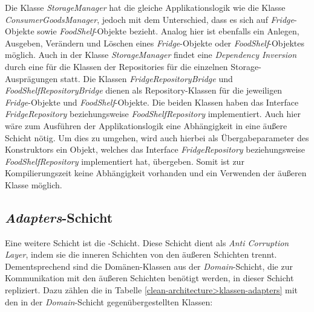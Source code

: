 Die Klasse \textit{StorageManager} hat die gleiche Applikationslogik wie die Klasse \textit{ConsumerGoodsManager}, jedoch mit dem Unterschied, dass es sich auf \textit{Fridge}-Objekte sowie \textit{FoodShelf}-Objekte bezieht.
Analog hier ist ebenfalls ein Anlegen, Ausgeben, Verändern und Löschen eines \textit{Fridge}-Objekte oder \textit{FoodShelf}-Objektes möglich.
Auch in der Klasse \textit{StorageManager} findet eine \textit{Dependency Inversion} durch eine \href{https://github.com/lucasmerkel/dhbw-advancedswe-programmentwurf/blob/2bab7b1c200507e4550ce7025485261d0e95ce07/swe_programmentwurf/consumergoods-inventory-planner/2-cip-application/src/main/java/de/dhbw/cip/application/StorageManager.java#L21}{} für die Klassen der Repositories für die einzelnen Storage-Ausprägungen statt.
Die Klassen \textit{FridgeRepositoryBridge} und \textit{FoodShelfRepositoryBridge} dienen als Repository-Klassen für die jeweiligen \textit{Fridge}-Objekte und \textit{FoodShelf}-Objekte. Die beiden Klassen haben das Interface \textit{FridgeRepository} beziehungsweise \textit{FoodShelfRepository} implementiert.
Auch hier wäre zum Ausführen der Applikationslogik eine Abhängigkeit in eine äußere Schicht nötig. Um dies zu umgehen, wird auch hierbei als Übergabeparameter des Konstruktors ein Objekt, welches das Interface \textit{FridgeRepository} beziehungsweise \textit{FoodShelfRepository} implementiert hat, übergeben.
Somit ist zur Kompilierungszeit keine Abhängigkeit vorhanden und ein Verwenden der äußeren Klasse möglich.


\subsection*{\textit{Adapters}-Schicht}
Eine weitere Schicht ist die \href{https://github.com/lucasmerkel/dhbw-advancedswe-programmentwurf/tree/main/swe_programmentwurf/consumergoods-inventory-planner/1-cip-adapters}{}-Schicht.
Diese Schicht dient als \textit{Anti Corruption Layer}, indem sie die inneren Schichten von den äußeren Schichten trennt.
Dementsprechend sind die Domänen-Klassen aus der \textit{Domain}-Schicht, die zur Kommunikation mit den äußeren Schichten benötigt werden, in dieser Schicht repliziert.
Dazu zählen die in Tabelle \ref{clean-architecture>klassen-adapters} mit den in der \textit{Domain}-Schicht gegenübergestellten Klassen:

